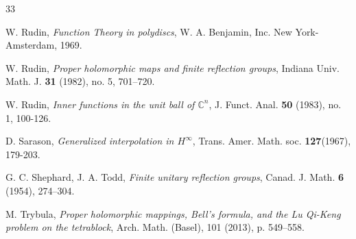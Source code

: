\documentclass[12pt,reqno]{amsart}
\theoremstyle{remark}
\theoremstyle{definition}
\begin{document}
\begin{thebibliography}{33}





 W. Rudin, \emph{Function Theory in polydiscs}, W. A. Benjamin, Inc. New York-Amsterdam, 1969.

 W. Rudin, \emph{Proper holomorphic maps and finite reflection groups}, Indiana Univ. Math. J. {\bf 31} (1982), no. 5, 701–720.

 W. Rudin, \emph{Inner functions in the unit ball of $\mathbb C^n$}, J. Funct. Anal. {\bf 50} (1983), no. 1, 100-126.

 D. Sarason, \emph{Generalized interpolation in $H^\infty$}, Trans. Amer. Math. soc. {\bf 127}(1967), 179-203.

 G. C. Shephard, J. A. Todd, \emph{Finite unitary reflection groups}, Canad. J. Math. {\bf 6} (1954), 274–304.

M. Trybula, \emph{Proper holomorphic mappings, Bell’s formula, and the Lu Qi-Keng problem on the
tetrablock}, Arch. Math. (Basel), 101 (2013), p. 549–558. 










\end{thebibliography}
\end{document}
